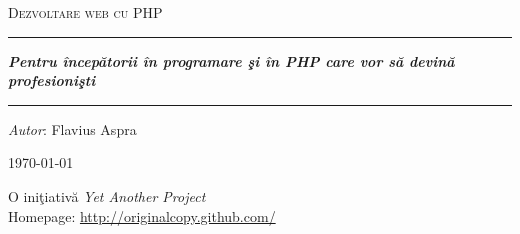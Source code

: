 \begin{titlepage}
\thispagestyle{empty}

\vspace*{10em}

\begin{center}
\textsc{\huge Dezvoltare web cu PHP}\\[5em]

\hrule

\vspace{3em}
\textit{\textbf{Pentru începătorii în programare şi în PHP care vor să devină profesionişti}}
\vspace{3em}
\hrule
\vspace{8em}
\textit{Autor}: Flavius Aspra
\vspace{3em}

\today
\end{center}

\vfill

\begin{flushright}
\begin{Large}
O iniţiativă \emph{Yet Another Project}\\
Homepage: \url{http://originalcopy.github.com/}
\end{Large}
\end{flushright}

\pagebreak
\end{titlepage}